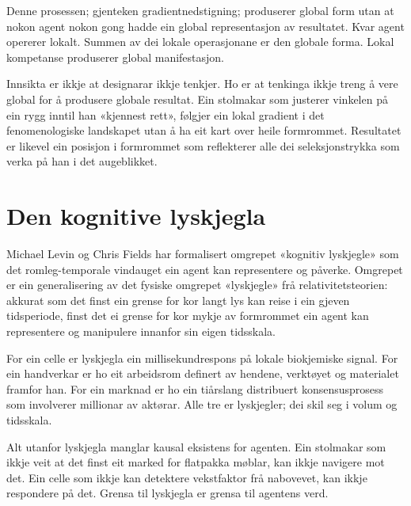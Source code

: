 Denne prosessen; gjenteken gradientnedstigning; produserer global form utan at nokon agent nokon gong hadde ein global representasjon av resultatet. Kvar agent opererer lokalt. Summen av dei lokale operasjonane er den globale forma. Lokal kompetanse produserer global manifestasjon.

Innsikta er ikkje at designarar ikkje tenkjer. Ho er at tenkinga ikkje treng å vere global for å produsere globale resultat. Ein stolmakar som justerer vinkelen på ein rygg inntil han «kjennest rett», følgjer ein lokal gradient i det fenomenologiske landskapet utan å ha eit kart over heile formrommet. Resultatet er likevel ein posisjon i formrommet som reflekterer alle dei seleksjonstrykka som verka på han i det augeblikket.

\section*{Den kognitive lyskjegla}


Michael Levin og Chris Fields har formalisert omgrepet «kognitiv lyskjegle» som det romleg-temporale vindauget ein agent kan representere og påverke. Omgrepet er ein generalisering av det fysiske omgrepet «lyskjegle» frå relativitetsteorien: akkurat som det finst ein grense for kor langt lys kan reise i ein gjeven tidsperiode, finst det ei grense for kor mykje av formrommet ein agent kan representere og manipulere innanfor sin eigen tidsskala.

For ein celle er lyskjegla ein millisekundrespons på lokale biokjemiske signal. For ein handverkar er ho eit arbeidsrom definert av hendene, verktøyet og materialet framfor han. For ein marknad er ho ein tiårslang distribuert konsensusprosess som involverer millionar av aktørar. Alle tre er lyskjegler; dei skil seg i volum og tidsskala.

Alt utanfor lyskjegla manglar kausal eksistens for agenten. Ein stolmakar som ikkje veit at det finst eit marked for flatpakka møblar, kan ikkje navigere mot det. Ein celle som ikkje kan detektere vekstfaktor frå nabovevet, kan ikkje respondere på det. Grensa til lyskjegla er grensa til agentens verd.


